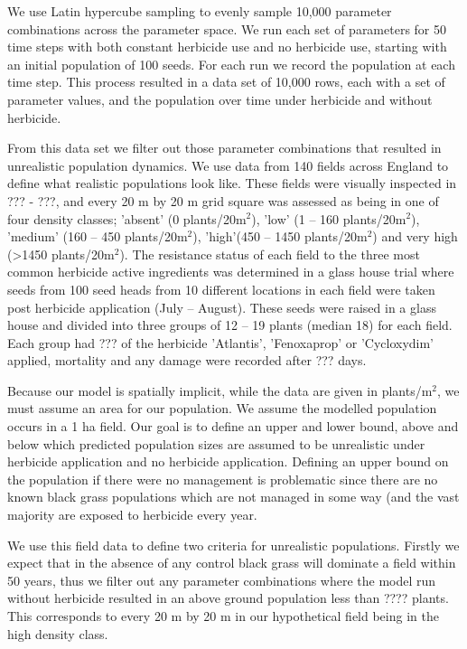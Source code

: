 \documentclass[12pt, a4paper]{article}
\begin{document}
We use Latin hypercube sampling to evenly sample 10,000 parameter combinations across the parameter space. We run each set of parameters for 50 time steps with both constant herbicide use and no herbicide use, starting with an initial population of 100 seeds. For each run we record the population at each time step. This process resulted in a data set of 10,000 rows, each with a set of parameter values, and the population over time under herbicide and without herbicide.  

From this data set we filter out those parameter combinations that resulted in unrealistic population dynamics. We use data from 140 fields across England to define what realistic populations look like. These fields were visually inspected in ??? - ???, and every 20 m by 20 m grid square was assessed as being in one of four density classes; 'absent' (0 plants/20m$^2$), 'low' (1 -- 160 plants/20m$^2$), 'medium' (160 -- 450 plants/20m$^2$), 'high'(450 -- 1450 plants/20m$^2$) and very high (>1450 plants/20m$^2$). The resistance status of each field to the three most common herbicide active ingredients was determined in a glass house trial where seeds from 100 seed heads from 10 different locations in each field were taken post herbicide application (July -- August). These seeds were raised in a glass house and divided into three groups of 12 -- 19 plants (median 18) for each field. Each group had ??? of the herbicide 'Atlantis', 'Fenoxaprop' or 'Cycloxydim' applied, mortality and any damage were recorded after ??? days. 

Because our model is spatially implicit, while the data are given in plants/m$^2$, we must assume an area for our population. We assume the modelled population occurs in a 1 ha field. Our goal is to define an upper and lower bound, above and below which predicted population sizes are assumed to be unrealistic under herbicide application and no herbicide application. Defining an upper bound on the population if there were no management is problematic since there are no known black grass populations which are not managed in some way (and the vast majority are exposed to herbicide every year.    

We use this field data to define two criteria for unrealistic populations. Firstly we expect that in the absence of any control black grass will dominate a field within 50 years, thus we filter out any parameter combinations where the model run without herbicide resulted in an above ground population less than ???? plants. This corresponds to every 20 m by 20 m in our hypothetical field being in the high density class.          
\end{document}
